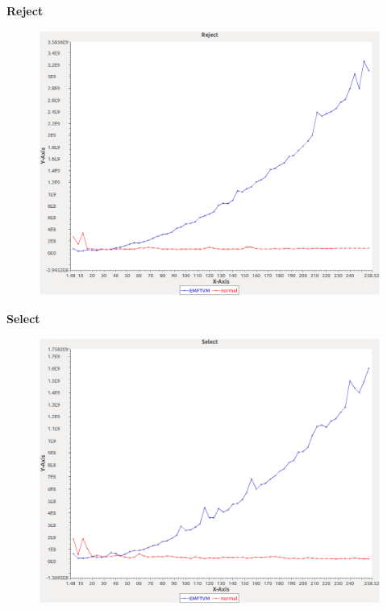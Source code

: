 \noindent\textbf{Reject}

\begin{figure}[h]
\centering
\includegraphics[width=\textwidth]{../graphs/sequence/Reject}
\end{figure}
\pagebreak

\noindent\textbf{Select}

\begin{figure}[h]
\centering
\includegraphics[width=\textwidth]{../graphs/sequence/Select}
\end{figure}
\pagebreak

